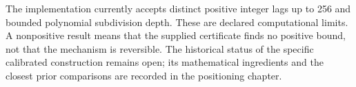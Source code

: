 The implementation currently accepts distinct positive integer lags up to 256
and bounded polynomial subdivision depth. These are declared computational
limits. A nonpositive result means that the supplied certificate finds no
positive bound, not that the mechanism is reversible. The historical status of
the specific calibrated construction remains open; its mathematical ingredients
and the closest prior comparisons are recorded in the positioning chapter.
